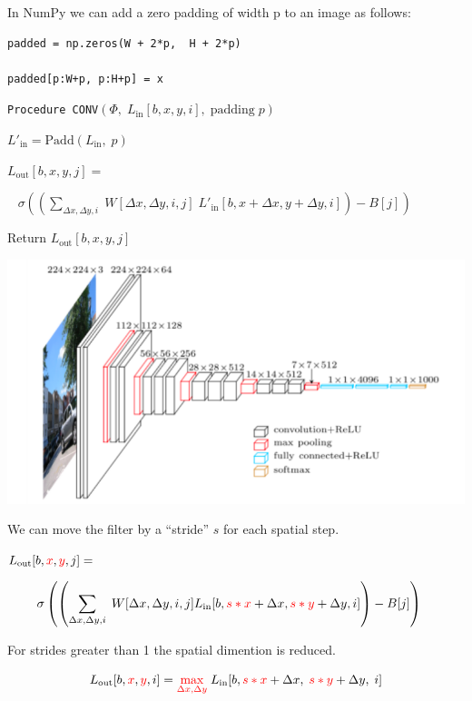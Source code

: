 {In NumPy we can add a zero padding of width p to an image as follows:

\vfill
\begin{verbatim}
padded = np.zeros(W + 2*p,  H + 2*p)

padded[p:W+p, p:H+p] = x
\end{verbatim}


{\tt Procedure CONV}$(\Phi,\; L_{\mathrm{in}}[b,x,y,i],\;\mathrm{padding}\;p)$

\vfill
$L'_{\mathrm{in}} = \mathrm{Padd}(L_{\mathrm{in}},\;p)$

\vfill
$L_{\mathrm{out}}[b,x,y,j] =$

\vfill
$\;\;\;\sigma\left(\left(\sum_{\Delta x, \Delta y, i}\;W[\Delta x, \Delta y, i,j]\;L'_{\mathrm{in}}[b,x + \Delta x, y + \Delta y, i]\right) - B[j] \right)$


\vfill
Return $L_{\mathrm{out}}[b,x,y,j]$


\centerline{\includegraphics[width = 8.0in]{../images/VGG}}


We can move the filter by a ``stride'' $s$ for each spatial step.

\vfill
$L_{\mathrm{out}}[b,{\color{red}x},{\color{red}y},j] =$

$$\hspace{-1em}\sigma\left(\left(\sum_{\Delta x,\Delta y,i}\;W[\Delta x, \Delta y, i, j] L_{\mathrm{in}}[b,{\color{red} s*x} + \Delta x, {\color{red} s*y} + \Delta y, i]\right) - B[j]\right)$$

\vfill
For strides greater than 1 the spatial dimention is reduced.


$$L_{\mathrm{out}}[b,{\color{red}x},{\color{red}y},i] = {\color{red} \max_{\Delta x, \Delta y}}\; L_{\mathrm{in}}[b,{\color{red} s*x} + \Delta x,\; {\color{red} s*y} + \Delta y,\; i]$$

}
